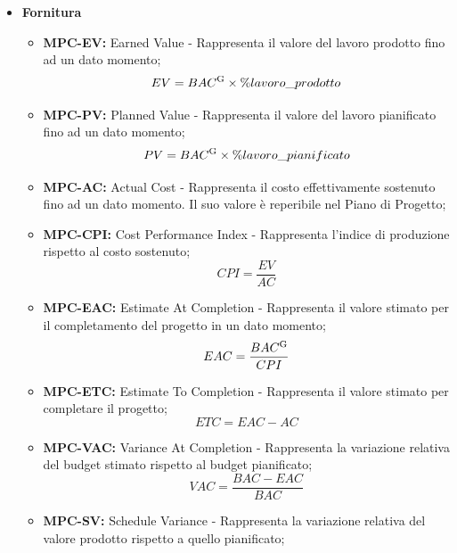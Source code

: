 \documentclass[8pt]{article}
\newcommand{\glossterm}[1]{#1\textsuperscript{G}} %
\begin{document}
\begin{itemize}
   \item \textbf{Fornitura}
        \begin{itemize}
            \item \textbf{MPC-EV:} Earned Value - Rappresenta il valore del lavoro prodotto fino ad un dato momento;
                \begin{equation}
                EV = \glossterm{BAC} \times \%lavoro\_prodotto
                \end{equation}
            \item \textbf{MPC-PV:} Planned Value - Rappresenta il valore del lavoro pianificato fino ad un dato momento;
                \begin{equation}
                PV = \glossterm{BAC} \times \%lavoro\_pianificato
                \end{equation}
            \item \textbf{MPC-AC:} Actual Cost - Rappresenta il costo effettivamente sostenuto fino ad un dato momento. Il suo valore è reperibile nel Piano di Progetto;
            \item \textbf{MPC-CPI:} Cost Performance Index - Rappresenta l'indice di produzione rispetto al costo sostenuto;
                \begin{equation}
                CPI = \frac{EV}{AC}
                \end{equation}
            \item \textbf{MPC-EAC:} Estimate At Completion - Rappresenta il valore stimato per il completamento del progetto in un dato momento;
                \begin{equation}
                EAC = \frac{\glossterm{BAC}}{CPI}
                \end{equation}
            \item \textbf{MPC-ETC:} Estimate To Completion - Rappresenta il valore stimato per completare il progetto;
                \begin{equation}
                ETC = EAC - AC
                \end{equation}
            \item \textbf{MPC-VAC:} Variance At Completion - Rappresenta la variazione relativa del budget stimato rispetto al budget pianificato;
                \begin{equation}
                VAC = \frac{BAC - EAC}{BAC}
                \end{equation}
            \item \textbf{MPC-SV:} Schedule Variance - Rappresenta la variazione relativa del valore prodotto rispetto a quello pianificato;

\end{itemize}
\end{itemize}
\end{document}
